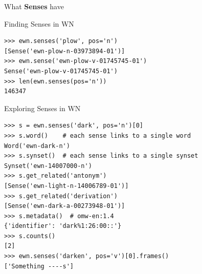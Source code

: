\documentclass[aspectratio=169]{beamer}
\begin{document}
\begin{frame}{What \textbf{Senses} have}
\end{frame}


\begin{frame}[fragile]{Finding Senses in WN}
\begin{verbatim}
>>> ewn.senses('plow', pos='n')
[Sense('ewn-plow-n-03973894-01')]
>>> ewn.sense('ewn-plow-v-01745745-01')
Sense('ewn-plow-v-01745745-01')
>>> len(ewn.senses(pos='n'))
146347
\end{verbatim}
\end{frame}

\begin{frame}[fragile]{Exploring Senses in WN}
\begin{verbatim}
>>> s = ewn.senses('dark', pos='n')[0]
>>> s.word()    # each sense links to a single word
Word('ewn-dark-n')
>>> s.synset()  # each sense links to a single synset
Synset('ewn-14007000-n')
>>> s.get_related('antonym')
[Sense('ewn-light-n-14006789-01')]
>>> s.get_related('derivation')
[Sense('ewn-dark-a-00273948-01')]
>>> s.metadata()  # omw-en:1.4
{'identifier': 'dark%1:26:00::'}
>>> s.counts()
[2]
>>> ewn.senses('darken', pos='v')[0].frames()
['Something ----s']
\end{verbatim}
\end{frame}
\end{document}
